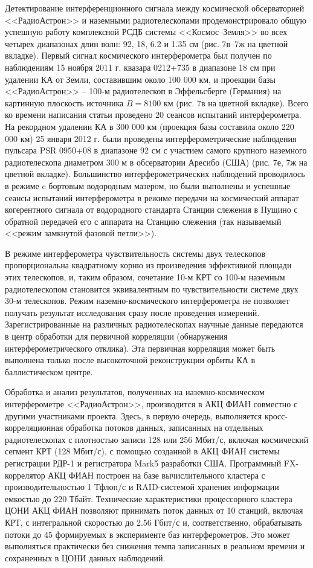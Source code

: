 Детектирование интерференционного сигнала между космической обсерваторией
<<РадиоАстрон>>
и наземными радиотелескопами продемонстрировало общую успешную работу
комплексной РСДБ системы <<Космос--Земля>> во всех четырех диапазонах длин волн:
92, 18, 6.2 и 1.35 см (рис. 7в--7ж на цветной вкладке).
Первый сигнал космического
интерферометра был получен по наблюдениям 15 ноября 2011 г. квазара 0212+735 в
диапазоне 18 см при удалении КА от Земли, составившим около 100 000 км,
и проекции базы <<РадиоАстрон>> -- 100-м радиотелескоп в Эффельсберге
(Германия) на картинную плоскость источника $B = 8100$ км (рис. 7в на цветной вкладке).
Всего ко времени написания статьи проведено 20 сеансов испытаний интерферометра.
На рекордном удалении КА в 300 000 км (проекция базы составила
около 220 000 км) 25 января 2012 г. были проведены интерферометрические
наблюдения пульсара PSR 0950+08 в диапазоне 92 см с участием самого крупного
наземного радиотелескопа диаметром 300 м в обсерватории Аресибо (США) (рис. 7е, 7ж на цветной
вкладке).
Большинство
интерферометрических наблюдений проводилось в режиме c бортовым водородным
мазером, но были выполнены и успешные сеансы испытаний интерферометра в режиме
передачи на космический аппарат когерентного сигнала от водородного стандарта
Станции слежения в Пущино с обратной передачей его с аппарата на Станцию слежения
(так называемый <<режим замкнутой фазовой петли>>).

В режиме интерферометра чувствительность системы двух телескопов
пропорциональна квадратному корню из произведения эффективной
площади этих телескопов, и, таким образом, сочетание 10-м КРТ со 100-м
наземным радиотелескопом становится эквивалентным по чувствительности
системе двух 30-м телескопов. Режим наземно-космического
интерферометра не позволяет
получать результат исследования сразу после проведения измерений.
Зарегистрированные на различных радиотелескопах научные данные
передаются в центр обработки для первичной корреляции (обнаружения
интерферометрического отклика). Эта первичная корреляция может быть
выполнена только после высокоточной реконструкции орбиты КА в
баллистическом центре.

Обработка и анализ результатов, полученных на наземно-космическом интерферометре <<РадиоАстрон>>,
производится в АКЦ ФИАН совместно с другими участниками проекта. Здесь, в первую очередь,
выполняется кросс-корреляционная обработка потоков данных, записанных на отдельных радиотелескопах с
плотностью записи 128 или 256 Мбит/с, включая космический сегмент КРТ (128 Мбит/с), с помощью
созданной в АКЦ ФИАН системы регистрации РДР-1 \cite{Belousov_2007} и регистратора Mark5
\cite{Whitney_2003} разработки США. Программный FX-коррелятор АКЦ ФИАН построен на базе
вычислительного кластера с производительностью 1 Тфлоп/с и RAID-системой хранения информации
емкостью до 220 Тбайт. Технические характеристики процессорного кластера ЦОНИ АКЦ ФИАН позволяют
принимать поток данных от 10 станций, включая КРТ, с интегральной скоростью до 2.56 Гбит/с и,
соответственно, обрабатывать потоки до 45 формируемых в эксперименте баз интерферометров. Это может
выполняться практически без снижения темпа записанных в реальном времени и сохраненных в ЦОНИ данных
наблюдений.

